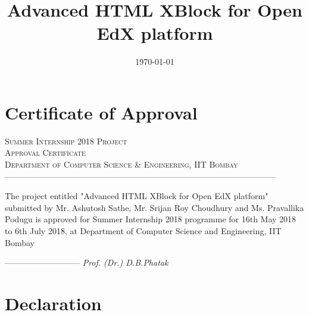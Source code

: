 \documentclass[a4paper, twosided, openany]{memoir}
\begin{document}
\pagestyle{plain}
\title{Advanced HTML XBlock for Open EdX platform}
\date{\today}

\frontmatter


\chapter*{Certificate of Approval}

\begin{center}
\textsc{\LARGE Summer Internship 2018 Project}\\
\bigskip
\textsc{\Large Approval Certificate}\\
\bigskip
\textsc{ Department of Computer Science \& Engineering, IIT Bombay}\\
\textsc{--------------------------------------------------------------------------------------------------}\\
\bigskip\bigskip\bigskip\bigskip\bigskip\bigskip

The project entitled "Advanced HTML XBlock for Open EdX platform" submitted by Mr. Ashutosh Sathe, Mr. Srijan Roy Choudhury and Ms. Pravallika Podugu is approved for Summer Internship 2018 programme for 16th May 2018 to 6th July 2018, at Department of Computer Science and Engineering, IIT Bombay
\end{center}
\vspace*{\fill}
\begin{center}
	\begin{flushleft}
		\bigskip
		\textsc{---------------------------}\newline
		\bigskip
		\emph{Prof. (Dr.) D.B.Phatak}
	\end{flushleft}
\end{center}
\chapter*{Declaration}
\begin{center}

\end{center}
\end{document}
